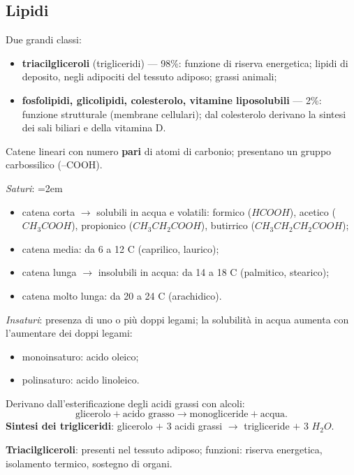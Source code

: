 \subsection{Lipidi}

Due grandi classi:
\begin{itemize}
  \item \textbf{triacilgliceroli} (trigliceridi) --- 98\%: funzione di riserva energetica; lipidi di deposito, negli adipociti del tessuto adiposo; grassi animali;
  \item \textbf{fosfolipidi, glicolipidi, colesterolo, vitamine liposolubili} --- 2\%: funzione strutturale (membrane cellulari); dal colesterolo derivano la sintesi dei sali biliari e della vitamina D.
\end{itemize}

Catene lineari con numero \textbf{pari} di atomi di carbonio; presentano un gruppo carbossilico (--COOH).

\textit{Saturi}:
\begingroup\emergencystretch=2em
\begin{itemize}
  \item catena corta $\rightarrow$ solubili in acqua e volatili: formico ($HCOOH$), acetico ($CH_3COOH$), propionico ($CH_3CH_2COOH$), butirrico ($CH_3CH_2CH_2COOH$);
  \item catena media: da 6 a 12 C (caprilico, laurico);
  \item catena lunga $\rightarrow$ insolubili in acqua: da 14 a 18 C (palmitico, stearico);
  \item catena molto lunga: da 20 a 24 C (arachidico).
\end{itemize}
\endgroup

\textit{Insaturi}: presenza di uno o più doppi legami; la solubilità in acqua aumenta con l'aumentare dei doppi legami:
\begin{itemize}
  \item monoinsaturo: acido oleico;
  \item polinsaturo: acido linoleico.
\end{itemize}

Derivano dall'esterificazione degli acidi grassi con alcoli:
\[
\text{glicerolo} + \text{acido grasso} \rightarrow \text{monogliceride} + \text{acqua}.
\]
\textbf{Sintesi dei trigliceridi}: glicerolo $+$ 3 acidi grassi $\rightarrow$ trigliceride $+$ 3 $H_2O$.

\textbf{Triacilgliceroli}: presenti nel tessuto adiposo; funzioni: riserva energetica, isolamento termico, sostegno di organi.

